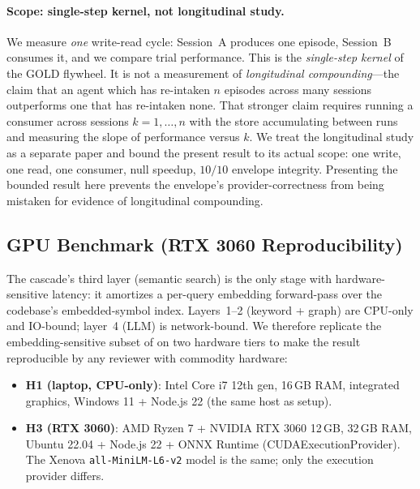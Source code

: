 \documentclass[conference]{IEEEtran}
\begin{document}
\paragraph{Scope: single-step kernel, not longitudinal study.}
We measure \emph{one} write-read cycle: Session~A produces one episode,
Session~B consumes it, and we compare trial performance. This is the
\emph{single-step kernel} of the GOLD flywheel. It is not a measurement
of \emph{longitudinal compounding}---the claim that an agent which has
re-intaken $n$ episodes across many sessions outperforms one that has
re-intaken none. That stronger claim requires running a consumer across
sessions $k = 1, \ldots, n$ with the store accumulating between runs
and measuring the slope of performance versus $k$. We treat the
longitudinal study as a separate paper and bound the present result
to its actual scope: one write, one read, one consumer, null speedup,
$10/10$ envelope integrity. Presenting the bounded result here prevents
the envelope's provider-correctness from being mistaken for evidence
of longitudinal compounding.


\subsection{GPU Benchmark (RTX 3060 Reproducibility)}
\label{sec:eval:gpu}

The cascade's third layer (semantic search) is the only stage with
hardware-sensitive latency: it amortizes a per-query embedding
forward-pass over the codebase's embedded-symbol index. Layers~1--2
(keyword + graph) are CPU-only and IO-bound; layer~4 (LLM) is
network-bound. We therefore replicate the embedding-sensitive subset of
 on two hardware tiers to make the
result reproducible by any reviewer with commodity hardware:

\begin{itemize}
  \item \textbf{H1 (laptop, CPU-only)}: Intel Core i7 12th gen, 16\,GB
    RAM, integrated graphics, Windows 11 + Node.js 22 (the same host as
     setup).
  \item \textbf{H3 (RTX 3060)}: AMD Ryzen 7 + NVIDIA RTX 3060 12\,GB,
    32\,GB RAM, Ubuntu 22.04 + Node.js 22 + ONNX Runtime
    (CUDAExecutionProvider). The Xenova \texttt{all-MiniLM-L6-v2} model
    is the same; only the execution provider differs.
\end{itemize}
\end{document}
